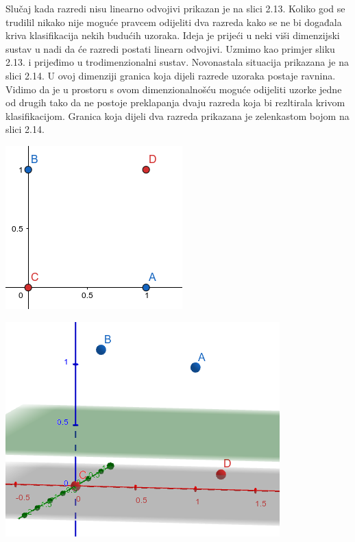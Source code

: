\documentclass[times, utf8, zavrsni]{fer}
\begin{document}
\begin{multicols}{2}
Slučaj kada razredi nisu linearno odvojivi prikazan je na slici 2.13. Koliko god se trudilil nikako 
nije moguće pravcem odijeliti dva razreda kako se ne bi događala kriva klasifikacija nekih 
budućih uzoraka. Ideja je prijeći u neki viši dimenzijski sustav u nadi da će razredi postati 
linearn odvojivi. Uzmimo kao primjer sliku 2.13. i prijeđimo u trodimenzionalni sustav. Novonastala 
situacija prikazana je na slici 2.14. U ovoj dimenziji granica koja dijeli razrede uzoraka 
postaje ravnina. Vidimo da je u prostoru s ovom dimenzionalnošću moguće odijeliti uzorke jedne 
od drugih tako da ne postoje preklapanja dvaju razreda koja bi rezltirala krivom klasifikacijom.
Granica koja dijeli dva razreda prikazana je zelenkastom bojom na slici 2.14.

\begin{minipage}{\linewidth}
\vspace{10pt}
\centering
\includegraphics[width=0.8\linewidth]{img/neseparabilni.png}
\end{minipage}
\end{multicols}


\begin{minipage}{\linewidth}
\vspace{10pt}
\centering
\includegraphics[width=0.7\linewidth]{img/3d.png}
\end{minipage}
\end{document}
